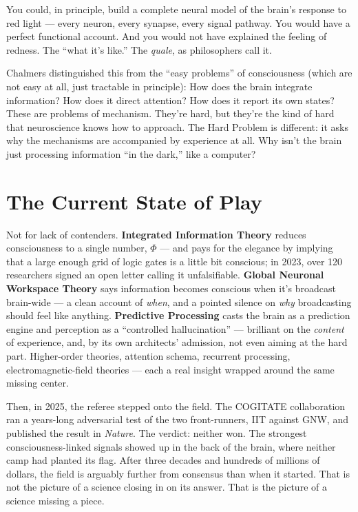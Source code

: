 \documentclass[11pt, twoside, openright]{book}
\begin{document}
You could, in principle, build a complete neural model of the brain's response to red light --- every neuron, every synapse, every signal pathway. You would have a perfect functional account. And you would not have explained the feeling of redness. The ``what it's like.'' The \textit{quale}, as philosophers call it.

Chalmers distinguished this from the ``easy problems'' of consciousness (which are not easy at all, just tractable in principle): How does the brain integrate information? How does it direct attention? How does it report its own states? These are problems of mechanism. They're hard, but they're the kind of hard that neuroscience knows how to approach. The Hard Problem is different: it asks why the mechanisms are accompanied by experience at all. Why isn't the brain just processing information ``in the dark,'' like a computer?

\section*{The Current State of Play}

Not for lack of contenders. \textbf{Integrated Information Theory} reduces consciousness to a single number, $\Phi$ --- and pays for the elegance by implying that a large enough grid of logic gates is a little bit conscious; in 2023, over 120 researchers signed an open letter calling it unfalsifiable. \textbf{Global Neuronal Workspace Theory} says information becomes conscious when it's broadcast brain-wide --- a clean account of \textit{when}, and a pointed silence on \textit{why} broadcasting should feel like anything. \textbf{Predictive Processing} casts the brain as a prediction engine and perception as a ``controlled hallucination'' --- brilliant on the \textit{content} of experience, and, by its own architects' admission, not even aiming at the hard part. Higher-order theories, attention schema, recurrent processing, electromagnetic-field theories --- each a real insight wrapped around the same missing center.

Then, in 2025, the referee stepped onto the field. The COGITATE collaboration ran a years-long adversarial test of the two front-runners, IIT against GNW, and published the result in \textit{Nature}. The verdict: neither won. The strongest consciousness-linked signals showed up in the back of the brain, where neither camp had planted its flag. After three decades and hundreds of millions of dollars, the field is arguably further from consensus than when it started. That is not the picture of a science closing in on its answer. That is the picture of a science missing a piece.
\end{document}
